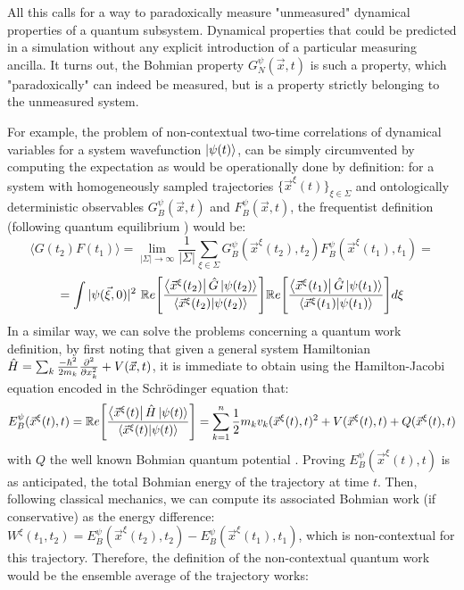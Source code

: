 \documentclass[11pt, a4paper]{article} %
\begin{document}
All this calls for a way to paradoxically measure "unmeasured" dynamical properties of a quantum subsystem. Dynamical properties that could be predicted in a simulation without any explicit introduction of a particular measuring ancilla. It turns out, the Bohmian property $G^\psi_N(\vec{x},t)$ is such a property, which "paradoxically" can indeed be measured, but is a property strictly belonging to the unmeasured system.

For example, the problem of non-contextual two-time correlations of dynamical variables for a system wavefunction $\ket{\psi(t)}$, can be simply circumvented by computing the expectation as would be operationally done by definition: for a system with homogeneously sampled trajectories $\{\vec{x}^\xi(t)\}_{\xi\in \Sigma}$ and ontologically deterministic observables $G_B^\psi(\vec{x},t)$ and $F_B^\psi(\vec{x},t)$, the frequentist definition (following quantum equilibrium \cite{Absolute}) would be:
\begin{equation}
\langle G(t_2)F(t_1)\rangle = \lim_{|\Sigma|\rightarrow \infty}\frac{1}{|\Sigma|} \sum_{\xi\in\Sigma} G_B^\psi(\vec{x}^\xi(t_2),t_2)F_B^\psi(\vec{x}^\xi(t_1),t_1) =
\end{equation}
$$
=  \int |\psi(\vec{\xi},0)|^2\ \mathbb{R}e\qty[ \frac{\bra{\vec{x}^\xi(t_2)}\hat{G}\ket{\psi(t_2)}}{\bra{\vec{x}^\xi(t_2)}\ket{\psi(t_2)}} ] \mathbb{R}e\qty[ \frac{\bra{\vec{x}^\xi(t_1)}\hat{G}\ket{\psi(t_1)}}{\bra{\vec{x}^\xi(t_1)}\ket{\psi(t_1)}} ]d\xi
$$
In a similar way, we can solve the problems concerning a quantum work definition, by first noting that given a general system Hamiltonian $\hat{H}=\sum_k \frac{-\hbar^2}{2m_k}\pdv[2]{}{x_k}+V(\vec{x},t)$, it is immediate to obtain using the Hamilton-Jacobi equation encoded in the Schrödinger equation that:
\begin{equation}
E^\psi_B(\vec{x}^\xi(t),t) = \mathbb{R}e\qty[ \frac{\bra{\vec{x}^\xi(t)}\hat{H}\ket{\psi(t)}}{\bra{\vec{x}^\xi(t)}\ket{\psi(t)}} ] = \sum_{k=1}^n\frac{1}{2}m_kv_k(\vec{x}^\xi(t),t)^2+V(\vec{x}^\xi(t),t)+Q(\vec{x}^\xi(t),t)
\end{equation}
with $Q$ the well known Bohmian quantum potential \cite{Durr}\cite{JordiXavier}. Proving $E^\psi_B(\vec{x}^\xi(t),t)$ is as anticipated, the total Bohmian energy of the trajectory at time $t$. Then, following classical mechanics, we can compute its associated Bohmian work (if conservative) as the energy difference: $W^\xi(t_1,t_2)= E^\psi_B(\vec{x}^\xi(t_2),t_2)-E^\psi_B(\vec{x}^\xi(t_1),t_1)$, which is non-contextual for this trajectory. Therefore, the definition of the non-contextual quantum work would be the ensemble average of the trajectory works:
\end{document}
